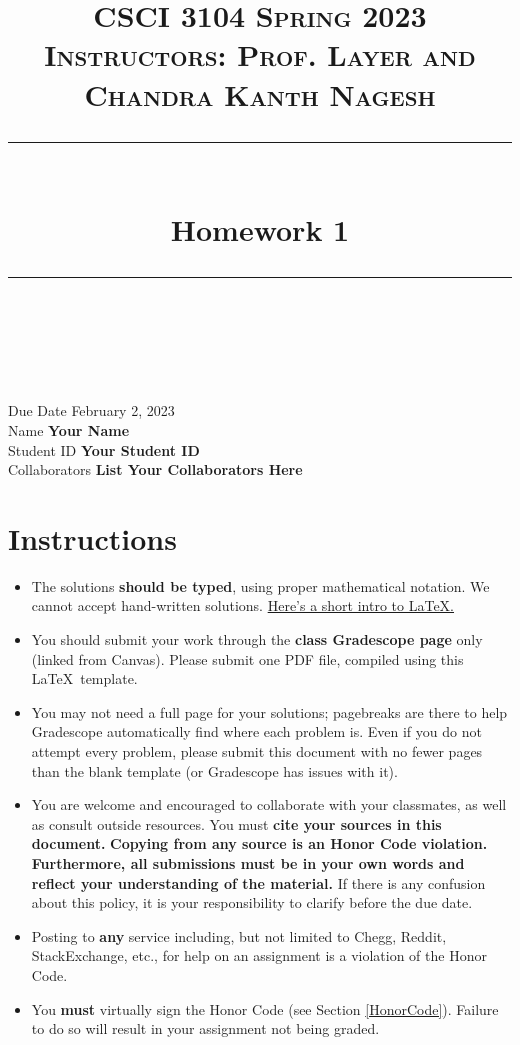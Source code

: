 \documentclass[11pt]{article}
\title{
\normalfont \normalsize 
\textsc{CSCI 3104 Spring 2023 \\ 
Instructors: Prof. Layer and Chandra Kanth Nagesh} \\
[10pt] 
\rule{\linewidth}{0.5pt} \\[6pt] 
\huge Homework 1 \\
\rule{\linewidth}{2pt}  \\[10pt]
}
\date{}
\theoremstyle{definition}
\theoremstyle{definition}
\theoremstyle{definition}
\begin{document}
\maketitle


\noindent
Due Date \dotfill February 2, 2023 \\
Name \dotfill \textbf{Your Name} \\
Student ID \dotfill \textbf{Your Student ID} \\
Collaborators \dotfill \textbf{List Your Collaborators Here}

\tableofcontents

\section{Instructions}
 \begin{itemize}
	\item The solutions \textbf{should be typed}, using proper mathematical notation. We cannot accept hand-written solutions. \href{http://ece.uprm.edu/~caceros/latex/introduction.pdf}{Here's a short intro to \LaTeX.}
	\item You should submit your work through the \textbf{class Gradescope page} only (linked from Canvas). Please submit one PDF file, compiled using this \LaTeX \ template.
	\item You may not need a full page for your solutions; pagebreaks are there to help Gradescope automatically find where each problem is. Even if you do not attempt every problem, please submit this document with no fewer pages than the blank template (or Gradescope has issues with it).

	\item You are welcome and encouraged to collaborate with your classmates, as well as consult outside resources. You must \textbf{cite your sources in this document.} \textbf{Copying from any source is an Honor Code violation. Furthermore, all submissions must be in your own words and reflect your understanding of the material.} If there is any confusion about this policy, it is your responsibility to clarify before the due date. 

	\item Posting to \textbf{any} service including, but not limited to Chegg, Reddit, StackExchange, etc., for help on an assignment is a violation of the Honor Code.

	\item You \textbf{must} virtually sign the Honor Code (see Section \ref{HonorCode}). Failure to do so will result in your assignment not being graded.
\end{itemize}
\end{document}
